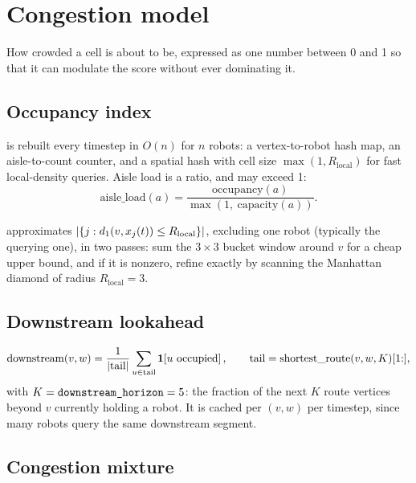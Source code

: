 \section{Congestion model}
\label{sec:congestion}

\begin{lede}
How crowded a cell is about to be, expressed as one number between 0 and 1 so
that it can modulate the score without ever dominating it.
\end{lede}

\subsection{Occupancy index}
\label{sec:congestion-index}

 is rebuilt every timestep in $O(n)$ for $n$ robots: a
vertex-to-robot hash map, an aisle-to-count counter, and a spatial hash with
cell size $\max(1, R_{\mathrm{local}})$ for fast local-density queries. Aisle
load is a ratio, and may exceed 1:
\begin{equation}
  \mathrm{aisle\_load}(a) = \frac{\mathrm{occupancy}(a)}{\max(1,\ \mathrm{capacity}(a))}.
\end{equation}

 approximates
$|\{j : d_1(v, x_{j}(t)) \leq R_{\mathrm{local}}\}|$, excluding one robot
(typically the querying one), in two passes: sum the $3 \times 3$ bucket window
around $v$ for a cheap upper bound, and if it is nonzero, refine exactly by
scanning the Manhattan diamond of radius $R_{\mathrm{local}} = 3$.

\subsection{Downstream lookahead}
\label{sec:congestion-downstream}

\begin{equation}
  \mathrm{downstream}(v, w)
    = \frac{1}{|\mathrm{tail}|}\sum_{u \in \mathrm{tail}} \mathbf{1}\!\left[\text{$u$ occupied}\right],
  \qquad
  \mathrm{tail} = \mathrm{shortest\_route}(v, w, K)[1{:}],
\end{equation}
with $K = \texttt{downstream\_horizon} = 5$: the fraction of the next $K$ route
vertices beyond $v$ currently holding a robot. It is cached per $(v, w)$ per
timestep, since many robots query the same downstream segment.

\subsection{Congestion mixture}
\label{sec:congestion-mixture}


